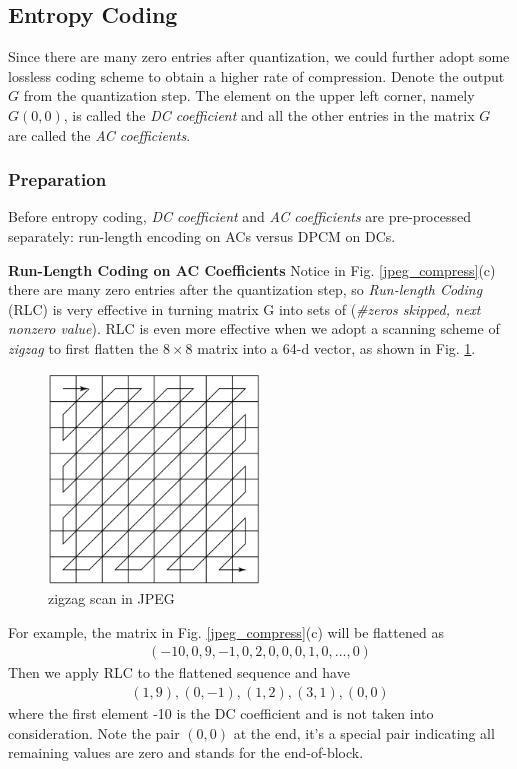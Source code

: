 \documentclass[11pt]{article}
\begin{document}
\subsection{Entropy Coding}
Since there are many zero entries after quantization, we could further adopt some lossless coding scheme to obtain a higher rate of compression. Denote the output $G$ from the quantization step. The element on the upper left corner, namely $G(0, 0)$, is called the \textit{DC coefficient} and all the other entries in the matrix $G$ are called the \textit{AC coefficients}.
\subsubsection{Preparation}
Before entropy coding, \textit{DC coefficient} and \textit{AC coefficients} are pre-processed separately: run-length encoding on ACs versus DPCM
on DCs.

\textbf{Run-Length Coding on AC Coefficients} Notice in Fig. \ref{jpeg_compress}(c) there are many zero entries after the quantization step, so \textit{Run-length Coding} (RLC) is very effective in turning matrix G into sets of (\textit{\#zeros skipped, next nonzero value}). RLC is even more effective when we adopt a scanning scheme of \textit{zigzag} to first flatten the $8\times8$ matrix into a 64-d vector, as shown in Fig. \ref{zigzag}. 
\begin{figure}
	\centering
\includegraphics[width=0.5\textwidth]{images/zigzag.png}
\caption{zigzag scan in JPEG\cite{c01}}
\label{zigzag}
\end{figure}
For example, the matrix in Fig. \ref{jpeg_compress}(c) will be flattened as
\begin{align*}
(-10, 0, 9, -1, 0, 2, 0, 0, 0, 1, 0, ..., 0)
\end{align*}
Then we apply RLC to the flattened sequence and have
\begin{align*}
(1, 9), (0, -1), (1, 2), (3, 1), (0, 0)
\end{align*}
where the first element -10 is the DC coefficient and is not taken into consideration. Note the pair $(0, 0)$ at the end, it's a special pair indicating all remaining values are zero and stands for the end-of-block.
\end{document}
